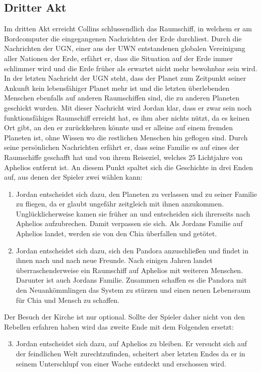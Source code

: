 \documentclass[12pt]{article}
\begin{document}
	\subsection{Dritter Akt}
	Im dritten Akt erreicht Collins schlussendlich das Raumschiff, in welchem er am Bordcomputer die eingegangenen Nachrichten der Erde durchliest. Durch die Nachrichten der UGN, einer aus der UWN entstandenen globalen Vereinigung aller Nationen der Erde, erfährt er, dass die Situation auf der Erde immer schlimmer wird und die Erde früher als erwartet nicht mehr bewohnbar sein wird. In der letzten Nachricht der UGN steht, dass der Planet zum Zeitpunkt seiner Ankunft kein lebensfähiger Planet mehr ist und die letzten überlebenden Menschen ebenfalls auf anderen Raumschiffen sind, die zu anderen Planeten geschickt wurden.\newline
	Mit dieser Nachricht wird Jordan klar, dass er zwar sein noch funktionsfähiges Raumschiff erreicht hat, es ihm aber nichts nützt, da es keinen Ort gibt, an den er zurückkehren könnte und er alleine auf einem fremden Planeten ist, ohne Wissen wo die restlichen Menschen hin geflogen sind.\newline
	Durch seine persönlichen Nachrichten erfährt er, dass seine Familie es auf eines der Raumschiffe geschafft hat und von ihrem Reiseziel, welches 25 Lichtjahre von Aphelios entfernt ist.\newline
	An diesem Punkt spaltet sich die Geschichte in drei Enden auf, aus denen der Spieler zwei wählen kann:
	\begin{enumerate}
		\item Jordan entscheidet sich dazu, den Planeten zu verlassen und zu seiner Familie zu fliegen, da er glaubt ungefähr zeitgleich mit ihnen anzukommen. Unglücklicherweise kamen sie früher an und entscheiden sich ihrerseits nach Aphelios aufzubrechen. Damit verpassen sie sich. Als Jordans Familie auf Aphelios landet, werden sie von den Chia überfallen und getötet.
		\item Jordan entscheidet sich dazu, sich den Pandora anzuschließen und findet in ihnen nach und nach neue Freunde. Nach einigen Jahren landet überraschenderweise ein Raumschiff auf Aphelios mit weiteren Menschen. Darunter ist auch Jordans Familie. Zusammen schaffen es die Pandora mit den Neuankömmlingen das System zu stürzen und einen neuen Lebensraum für Chia und Mensch zu schaffen.
	\end{enumerate}
	Der Besuch der Kirche ist nur optional. Sollte der Spieler daher nicht von den Rebellen erfahren haben wird das zweite Ende mit dem Folgenden ersetzt:
	\begin{enumerate}
		\setcounter{enumi}{2}
		\item Jordan entscheidet sich dazu, auf Aphelios zu bleiben. Er versucht sich auf der feindlichen Welt zurechtzufinden, scheitert aber letzten Endes da er in seinem Unterschlupf von einer Wache entdeckt und erschossen wird.
	\end{enumerate}
	\newpage
\end{document}
